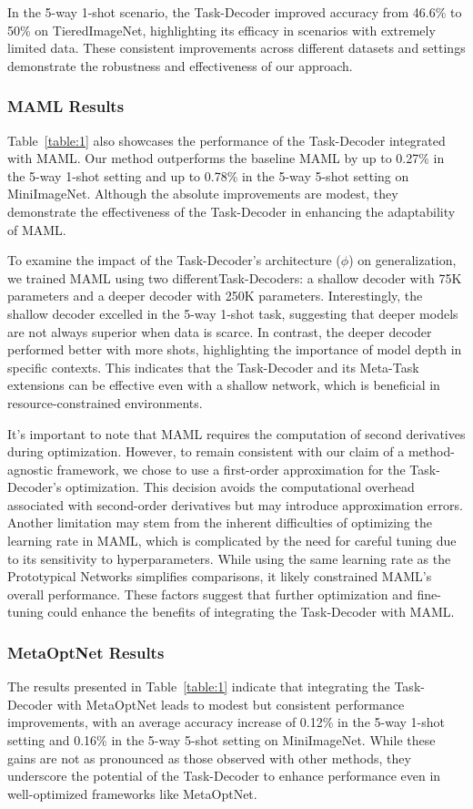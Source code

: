 In the 5-way 1-shot scenario, the Task-Decoder improved accuracy from 46.6\% to 50\% on TieredImageNet, highlighting its efficacy in scenarios with extremely limited data. These consistent improvements across different datasets and settings demonstrate the robustness and effectiveness of our approach.
\subsubsection*{MAML Results}
Table~\ref{table:1} also showcases the performance of the {Task-Decoder} integrated with MAML. Our method outperforms the baseline MAML by up to 0.27\% in the 5-way 1-shot setting and up to 0.78\% in the 5-way 5-shot setting on MiniImageNet. Although the absolute improvements are modest, they demonstrate the effectiveness of the {Task-Decoder} in enhancing the adaptability of MAML.

To examine the impact of the {Task-Decoder's} architecture ($\phi$) on generalization, we trained MAML using two different{Task-Decoders}: a shallow decoder with 75K parameters and a deeper decoder with 250K parameters. Interestingly, the shallow decoder excelled in the 5-way 1-shot task, suggesting that deeper models are not always superior when data is scarce. In contrast, the deeper decoder performed better with more shots, highlighting the importance of model depth in specific contexts. This indicates that the Task-Decoder and its Meta-Task extensions can be effective even with a shallow network, which is beneficial in resource-constrained environments.

It's important to note that MAML requires the computation of second derivatives during optimization. However, to remain consistent with our claim of a method-agnostic framework, we chose to use a first-order approximation for the Task-Decoder's optimization. This decision avoids the computational overhead associated with second-order derivatives but may introduce approximation errors. Another limitation may stem from the inherent difficulties of optimizing the learning rate in MAML, which is complicated by the need for careful tuning due to its sensitivity to hyperparameters. While using the same learning rate as the Prototypical Networks simplifies comparisons, it likely constrained MAML's overall performance. These factors suggest that further optimization and fine-tuning could enhance the benefits of integrating the Task-Decoder with MAML.

\subsubsection*{MetaOptNet Results}
The results presented in Table~\ref{table:1} indicate that integrating the Task-Decoder with MetaOptNet \cite{lee2019meta} leads to modest but consistent performance improvements, with an average accuracy increase of 0.12\% in the 5-way 1-shot setting and 0.16\% in the 5-way 5-shot setting on MiniImageNet. While these gains are not as pronounced as those observed with other methods, they underscore the potential of the Task-Decoder to enhance performance even in well-optimized frameworks like MetaOptNet.

